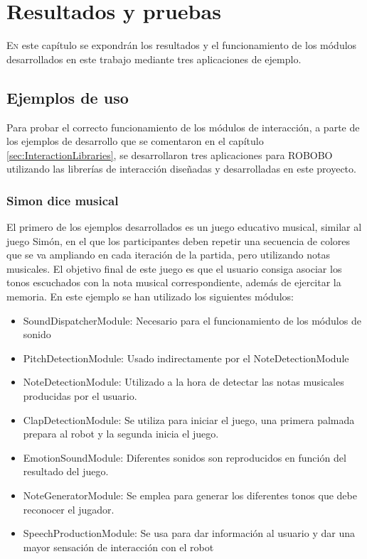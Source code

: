 \chapter{Resultados y pruebas}
\label{chap:results}
\vspace{0.5cm}


 
\lettrine{E}{n} este capítulo se expondrán los resultados y el funcionamiento de los módulos desarrollados en este trabajo mediante tres aplicaciones de ejemplo.
\section{Ejemplos de uso}
Para probar el correcto funcionamiento de los módulos de interacción, a parte de los ejemplos de desarrollo que se comentaron en el capítulo \ref{sec:InteractionLibraries}, se desarrollaron tres aplicaciones para ROBOBO utilizando las librerías de interacción diseñadas y desarrolladas en este proyecto.

\subsection{Simon dice musical}
\label{subsec:simon-musical}
El primero de los ejemplos desarrollados es un juego educativo musical, similar al juego Simón, en el que los participantes deben repetir una secuencia de colores que se va ampliando en cada iteración de la partida, pero utilizando notas musicales. El objetivo final de este juego es que el usuario consiga asociar los tonos escuchados con la nota musical correspondiente, además de ejercitar la memoria.
En este ejemplo se han utilizado los siguientes módulos:

\begin{itemize}
	\item SoundDispatcherModule: Necesario para el funcionamiento de los módulos de sonido
	\item PitchDetectionModule: Usado indirectamente por el NoteDetectionModule
	\item NoteDetectionModule: Utilizado a la hora de detectar las notas musicales producidas por el usuario.
	\item ClapDetectionModule: Se utiliza para iniciar el juego, una primera palmada prepara al robot y la segunda inicia el juego.
	\item EmotionSoundModule: Diferentes sonidos son reproducidos en función del resultado del juego.
	\item NoteGeneratorModule: Se emplea para generar los diferentes tonos que debe reconocer el jugador.
	\item SpeechProductionModule: Se usa para dar información al usuario y dar una mayor sensación de interacción con el robot
\end{itemize}

